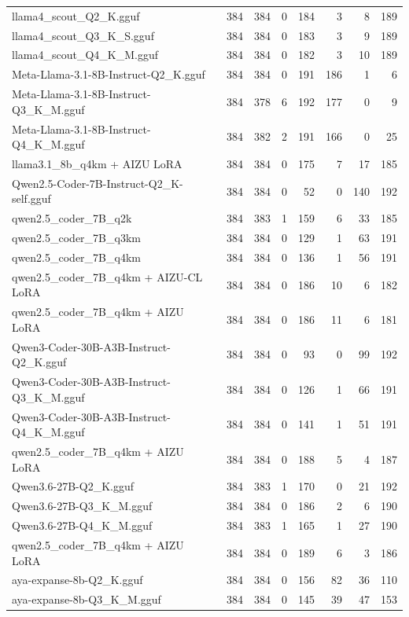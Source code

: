 \begin{table}[htbp]
{\begin{tabular}{lrrrrrrr}
    llama4\_scout\_Q2\_K.gguf & 384 & 384 & 0 & 184 & 3 & 8 & 189 \\
    llama4\_scout\_Q3\_K\_S.gguf & 384 & 384 & 0 & 183 & 3 & 9 & 189 \\
    llama4\_scout\_Q4\_K\_M.gguf & 384 & 384 & 0 & 182 & 3 & 10 & 189 \\
    Meta-Llama-3.1-8B-Instruct-Q2\_K.gguf & 384 & 384 & 0 & 191 & 186 & 1 & 6 \\
    Meta-Llama-3.1-8B-Instruct-Q3\_K\_M.gguf & 384 & 378 & 6 & 192 & 177 & 0 & 9 \\
    Meta-Llama-3.1-8B-Instruct-Q4\_K\_M.gguf & 384 & 382 & 2 & 191 & 166 & 0 & 25 \\
    llama3.1\_8b\_q4km + AIZU LoRA & 384 & 384 & 0 & 175 & 7 & 17 & 185 \\
    Qwen2.5-Coder-7B-Instruct-Q2\_K-self.gguf & 384 & 384 & 0 & 52 & 0 & 140 & 192 \\
    qwen2.5\_coder\_7B\_q2k & 384 & 383 & 1 & 159 & 6 & 33 & 185 \\
    qwen2.5\_coder\_7B\_q3km & 384 & 384 & 0 & 129 & 1 & 63 & 191 \\
    qwen2.5\_coder\_7B\_q4km & 384 & 384 & 0 & 136 & 1 & 56 & 191 \\
    qwen2.5\_coder\_7B\_q4km + AIZU-CL LoRA & 384 & 384 & 0 & 186 & 10 & 6 & 182 \\
    qwen2.5\_coder\_7B\_q4km + AIZU LoRA & 384 & 384 & 0 & 186 & 11 & 6 & 181 \\
    Qwen3-Coder-30B-A3B-Instruct-Q2\_K.gguf & 384 & 384 & 0 & 93 & 0 & 99 & 192 \\
    Qwen3-Coder-30B-A3B-Instruct-Q3\_K\_M.gguf & 384 & 384 & 0 & 126 & 1 & 66 & 191 \\
    Qwen3-Coder-30B-A3B-Instruct-Q4\_K\_M.gguf & 384 & 384 & 0 & 141 & 1 & 51 & 191 \\
    qwen2.5\_coder\_7B\_q4km + AIZU LoRA & 384 & 384 & 0 & 188 & 5 & 4 & 187 \\
    Qwen3.6-27B-Q2\_K.gguf & 384 & 383 & 1 & 170 & 0 & 21 & 192 \\
    Qwen3.6-27B-Q3\_K\_M.gguf & 384 & 384 & 0 & 186 & 2 & 6 & 190 \\
    Qwen3.6-27B-Q4\_K\_M.gguf & 384 & 383 & 1 & 165 & 1 & 27 & 190 \\
    qwen2.5\_coder\_7B\_q4km + AIZU LoRA & 384 & 384 & 0 & 189 & 6 & 3 & 186 \\
    aya-expanse-8b-Q2\_K.gguf & 384 & 384 & 0 & 156 & 82 & 36 & 110 \\
    aya-expanse-8b-Q3\_K\_M.gguf & 384 & 384 & 0 & 145 & 39 & 47 & 153 \\

\end{tabular}}
\end{table}
